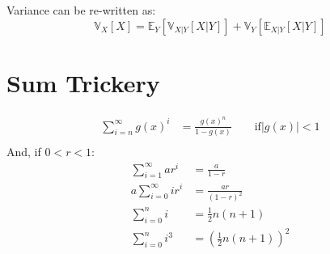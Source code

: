 Variance can be re-written as:
\begin{equation*}
    \mathbb{V}_X[X] = \mathbb{E}_Y[ \mathbb{V}_{X|Y}[X|Y] ] + \mathbb{V}_Y[
    \mathbb{E}_{X|Y}[X|Y] ] 
\end{equation*}


\section{Sum Trickery}
\begin{equation*}
    \begin{aligned}
        \sum_{i=n}^{\infty} g(x)^i &= \frac{g(x)^n}{1 - g(x)} \qquad \text{if}
        |g(x)| < 1 \\
    \end{aligned}
\end{equation*}
And, if $0 < r < 1$:
\begin{equation*}
    \begin{aligned}
        \sum_{i=1}^\infty a r^i &= \frac{a}{1 - r} \\
        a \sum_{i=0}^{\infty} ir^i &= \frac{ar}{(1-r)^2}\\
        \sum_{i=0}^n i &= \frac{1}{2} n(n+1)\\
        \sum_{i=0}^{n} i^3 &= \left(  \frac{1}{2} n (n+1)\right)^2 \\
    \end{aligned}
\end{equation*}


